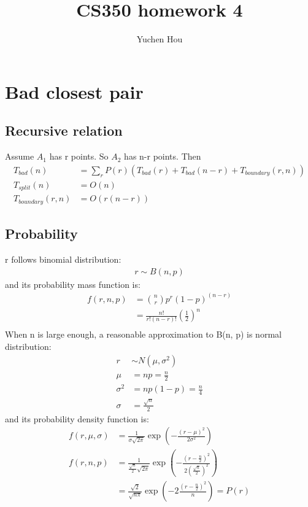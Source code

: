 \documentclass{article}
\begin{document}
\lstset{language=Java, tabsize=4}
\title{CS350 homework 4}
\author{Yuchen Hou}
\maketitle

\section{Bad closest pair}
\subsection{Recursive relation}
Assume $A_1$ has r points. So $A_2$ has n-r points. Then
\begin{align*}
T_{bad}(n) &= \sum_r P(r) (T_{bad}(r) + T_{bad}(n-r) + T_{boundary}(r, n))\\
T_{split}(n) &= O(n)\\
T_{boundary}(r, n) &= O(r(n-r))
\end{align*}
\subsection{Probability}
r follows binomial distribution:
\begin{align*}
r \sim B(n, p)
\end{align*}
and its probability mass function is:
\begin{align*}
f(r, n, p)
&= \binom{n}{r}p^r(1-p)^{(n-r)}\\
&=\frac{n!}{r!(n-r)!}(\frac{1}{2})^n\\
\end{align*}
When n is large enough, a reasonable approximation to B(n, p) is normal
distribution:
\begin{align*}
r &\sim N(\mu, \sigma^2)\\
\mu &= np = \frac{n}{2} \\
\sigma^2 &= np(1-p) = \frac{n}{4}\\
\sigma &= \frac{\sqrt{n}}{2}
\end{align*}
and its probability density function is:
\begin{align*}
f(r, \mu, \sigma)
&= \frac{1}{\sigma \sqrt{2\pi}}\exp(-\frac{(r-\mu)^2}{2\sigma^2})\\
f(r, n, p)
&= \frac{1}{\frac{\sqrt{n}}{2}
\sqrt{2\pi}}\exp(-\frac{(r-\frac{n}{2})^2}{2(\frac{\sqrt{n}}{2})^2})\\
&=\frac{\sqrt{2}}{\sqrt{n\pi}}\exp(-2\frac{(r-\frac{n}{2})^2}{n}) = P(r)
\end{align*}
\end{document}
